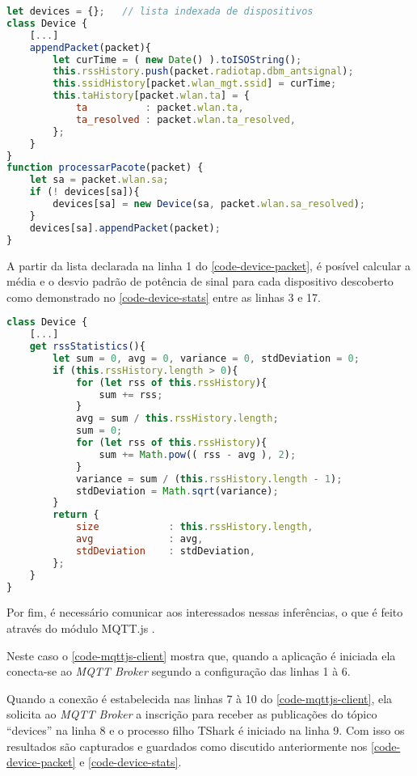 \begin{lstlisting}[language=javascript,caption={Adição do pacote ao histórico do dispositivo},label=code-device-packet]
let devices = {};	// lista indexada de dispositivos
class Device {
	[...]
	appendPacket(packet){
		let curTime = ( new Date() ).toISOString();
		this.rssHistory.push(packet.radiotap.dbm_antsignal);
		this.ssidHistory[packet.wlan_mgt.ssid] = curTime;
		this.taHistory[packet.wlan.ta] = {
			ta			: packet.wlan.ta,
			ta_resolved	: packet.wlan.ta_resolved,
		};
	}
}
function processarPacote(packet) {
	let sa = packet.wlan.sa;
	if (! devices[sa]){
		devices[sa] = new Device(sa, packet.wlan.sa_resolved);
	}
	devices[sa].appendPacket(packet);
}
\end{lstlisting}

A partir da lista declarada na linha 1 do \autoref{code-device-packet}, é
posível calcular a média e o desvio padrão de potência de sinal para cada
dispositivo descoberto como demonstrado no \autoref{code-device-stats} entre as
linhas 3 e 17.

\begin{lstlisting}[language=javascript,caption={Extração das estatísticas do dispositivo},label=code-device-stats]
class Device {
	[...]
	get rssStatistics(){
		let sum = 0, avg = 0, variance = 0, stdDeviation = 0;
		if (this.rssHistory.length > 0){
			for (let rss of this.rssHistory){
				sum += rss;
			}
			avg = sum / this.rssHistory.length;
			sum = 0;
			for (let rss of this.rssHistory){
				sum += Math.pow(( rss - avg ), 2);
			}
			variance = sum / (this.rssHistory.length - 1);
			stdDeviation = Math.sqrt(variance);
		}
		return {
			size			: this.rssHistory.length,
			avg				: avg,
			stdDeviation	: stdDeviation,
		};
	}
}
\end{lstlisting}

Por fim, é necessário comunicar aos interessados nessas inferências, o que é
feito através do módulo MQTT.js \cite{mqttjs}.

Neste caso o \autoref{code-mqttjs-client} mostra que, quando a aplicação é
iniciada ela conecta-se ao \emph{MQTT Broker} segundo a configuração das linhas
1 à 6.

Quando a conexão é estabelecida nas linhas 7 à 10 do
\autoref{code-mqttjs-client}, ela solicita ao \emph{MQTT Broker} a inscrição
para receber as publicações do tópico ``devices'' na linha 8 e o processo filho
TShark é iniciado na linha 9. Com isso os resultados são capturados e guardados
como discutido anteriormente nos \autoref{code-device-packet} e
\autoref{code-device-stats}.

